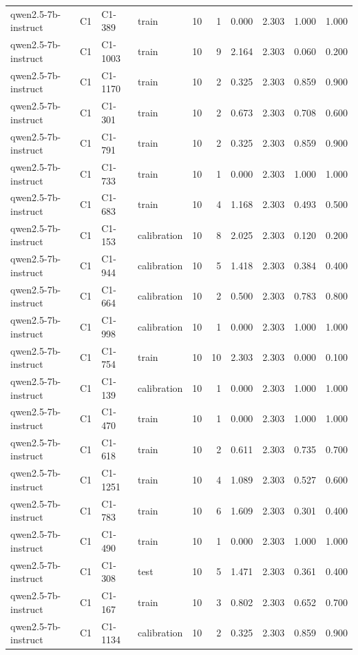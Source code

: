 \begin{table}
\begin{tabular}{llllrrrrrr}
qwen2.5-7b-instruct & C1 & C1-389 & train & 10 & 1 & 0.000 & 2.303 & 1.000 & 1.000 \\
qwen2.5-7b-instruct & C1 & C1-1003 & train & 10 & 9 & 2.164 & 2.303 & 0.060 & 0.200 \\
qwen2.5-7b-instruct & C1 & C1-1170 & train & 10 & 2 & 0.325 & 2.303 & 0.859 & 0.900 \\
qwen2.5-7b-instruct & C1 & C1-301 & train & 10 & 2 & 0.673 & 2.303 & 0.708 & 0.600 \\
qwen2.5-7b-instruct & C1 & C1-791 & train & 10 & 2 & 0.325 & 2.303 & 0.859 & 0.900 \\
qwen2.5-7b-instruct & C1 & C1-733 & train & 10 & 1 & 0.000 & 2.303 & 1.000 & 1.000 \\
qwen2.5-7b-instruct & C1 & C1-683 & train & 10 & 4 & 1.168 & 2.303 & 0.493 & 0.500 \\
qwen2.5-7b-instruct & C1 & C1-153 & calibration & 10 & 8 & 2.025 & 2.303 & 0.120 & 0.200 \\
qwen2.5-7b-instruct & C1 & C1-944 & calibration & 10 & 5 & 1.418 & 2.303 & 0.384 & 0.400 \\
qwen2.5-7b-instruct & C1 & C1-664 & calibration & 10 & 2 & 0.500 & 2.303 & 0.783 & 0.800 \\
qwen2.5-7b-instruct & C1 & C1-998 & calibration & 10 & 1 & 0.000 & 2.303 & 1.000 & 1.000 \\
qwen2.5-7b-instruct & C1 & C1-754 & train & 10 & 10 & 2.303 & 2.303 & 0.000 & 0.100 \\
qwen2.5-7b-instruct & C1 & C1-139 & calibration & 10 & 1 & 0.000 & 2.303 & 1.000 & 1.000 \\
qwen2.5-7b-instruct & C1 & C1-470 & train & 10 & 1 & 0.000 & 2.303 & 1.000 & 1.000 \\
qwen2.5-7b-instruct & C1 & C1-618 & train & 10 & 2 & 0.611 & 2.303 & 0.735 & 0.700 \\
qwen2.5-7b-instruct & C1 & C1-1251 & train & 10 & 4 & 1.089 & 2.303 & 0.527 & 0.600 \\
qwen2.5-7b-instruct & C1 & C1-783 & train & 10 & 6 & 1.609 & 2.303 & 0.301 & 0.400 \\
qwen2.5-7b-instruct & C1 & C1-490 & train & 10 & 1 & 0.000 & 2.303 & 1.000 & 1.000 \\
qwen2.5-7b-instruct & C1 & C1-308 & test & 10 & 5 & 1.471 & 2.303 & 0.361 & 0.400 \\
qwen2.5-7b-instruct & C1 & C1-167 & train & 10 & 3 & 0.802 & 2.303 & 0.652 & 0.700 \\
qwen2.5-7b-instruct & C1 & C1-1134 & calibration & 10 & 2 & 0.325 & 2.303 & 0.859 & 0.900 \\

\end{tabular}
\end{table}
